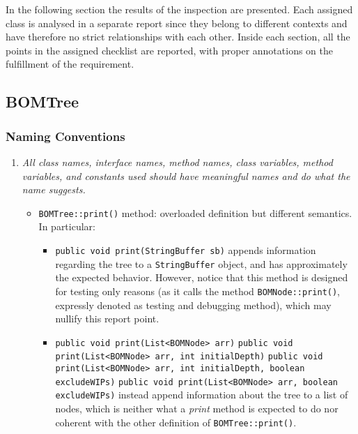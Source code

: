 In the following section the results of the inspection are presented.\newline
Each assigned class is analysed in a separate report since they belong to different contexts and have therefore no strict relationships with each other. Inside each section, all the points in the assigned checklist are reported, with proper annotations on the fulfillment of the requirement.

\subsection{BOMTree}
	\subsubsection{Naming Conventions}
		\begin{enumerate}
			\setcounter{enumi}{0}
			\item \textit{All class names, interface names, method names, class variables, method variables, and constants used should have meaningful names and do what the name suggests.}
			\begin{itemize}
				\item \texttt{BOMTree::print()} method: overloaded definition but different semantics. In particular:
				\begin{itemize}
					\item \texttt{public void print(StringBuffer sb)}\newline
					appends information regarding the tree to a \texttt{StringBuffer} object, and has approximately the expected behavior. However, notice that this method is  designed for testing only reasons (as it calls the method \texttt{BOMNode::print()}, expressly denoted as testing and debugging method), which may nullify this report point.
					\item \texttt{public void print(List<BOMNode> arr)}\newline
					\texttt{public void print(List<BOMNode> arr, int initialDepth)}\newline
					\texttt{public void print(List<BOMNode> arr, int initialDepth, boolean excludeWIPs)}\newline
					\texttt{public void print(List<BOMNode> arr, boolean excludeWIPs)}\newline
					instead append information about the tree to a list of nodes, which is neither what a \textit{print} method is expected to do nor coherent with the other definition of \texttt{BOMTree::print()}.
				\end{itemize}
			\end{itemize}


\end{enumerate}
